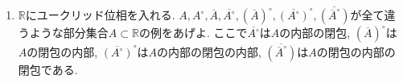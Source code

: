 \documentclass[dvipdfmx,a4paper,11pt]{article}
\newcommand{\R}{\mathbb{R}}
\newcommand{\Q}{\mathbb{Q}}
\theoremstyle{definition}
\begin{document}
\begin{enumerate}[label=\textbf{問}\ref*{sec-subspace}.\arabic*]


 
 




	



	




\item $\R$にユークリッド位相を入れる. $A,A^{\circ},\overline{A}, \overline{A^\circ}, {(\overline{A})}^\circ, {\overline{(A^\circ)}}^\circ, \overline{({\overline{A}}^\circ)}$が全て違うような部分集合$A \subset \R$の例をあげよ.
ここで$\overline{A^\circ}$は$A$の内部の閉包, 
${(\overline{A})}^\circ$は$A$の閉包の内部, ${\overline{(A^\circ)}}^\circ$は$A$の内部の閉包の内部, $\overline{({\overline{A}}^\circ)}$は$A$の閉包の内部の閉包である.




\end{enumerate}
\end{document}

